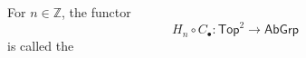\begin{definition}
	For $n \in \mathbb{Z}$, the functor 
	\begin{equation}
		H_n \circ C_\bullet : \mathsf{Top}^2 \to \mathsf{AbGrp}
	\end{equation}
	\noindent is called the 
\end{definition}
